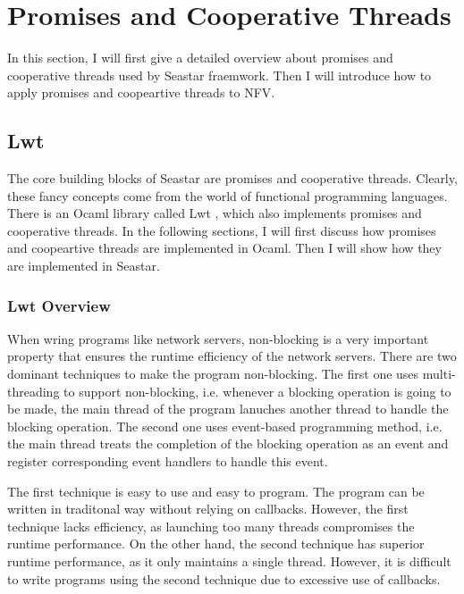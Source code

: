 

\section{Promises and Cooperative Threads}

In this section, I will first give a detailed overview about promises and
cooperative threads used by Seastar fraemwork. Then I will introduce how to
apply promises and coopeartive threads to NFV.

\subsection{Lwt}

The core building blocks of Seastar are promises and cooperative
threads. Clearly, these fancy concepts come from the world of functional
programming languages. There is an Ocaml library called Lwt \cite{vouillon2008lwt}, which also
implements promises and cooperative threads. In the following sections, I will
first discuss how promises and coopeartive threads are implemented in
Ocaml. Then I will show how they are implemented in Seastar.

\subsubsection{Lwt Overview}

When wring programs like network servers, non-blocking is a very important
property that ensures the runtime efficiency of the network servers. There are
two dominant techniques to make the program non-blocking. The first one uses
multi-threading to support non-blocking, i.e. whenever a blocking operation is
going to be made, the main thread of the program lanuches another thread to
handle the blocking operation. The second one uses event-based programming
method, i.e. the main thread treats the completion of the blocking operation as
an event and register corresponding event handlers to handle this event.

The first technique is easy to use and easy to program. The program can be
written in traditonal way without relying on callbacks. However, the first
technique lacks efficiency, as launching too many threads compromises the
runtime performance. On the other hand, the second technique has superior
runtime performance, as it only maintains a single thread. However, it is
difficult to write programs using the second technique due to excessive use of
callbacks.

